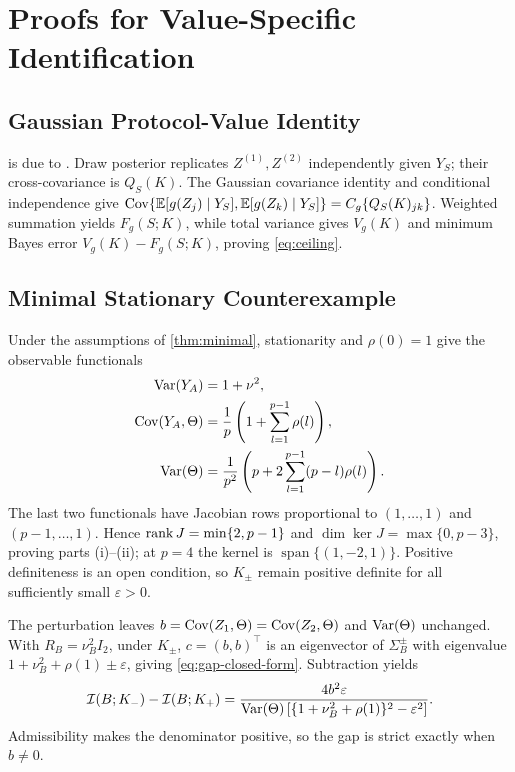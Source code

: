 \section{Proofs for Value-Specific Identification}
\label{sec:app-identification}

\subsection{Gaussian Protocol-Value Identity}

 is due to \citet{zhang2026label}. Draw posterior
replicates $Z^{(1)},Z^{(2)}$ independently given $Y_S$; their
cross-covariance is $Q_S(K)$. The Gaussian covariance identity and conditional
independence give
$\operatorname{Cov}\{\mathbb{E}[g(Z_j)\mid Y_S],\mathbb{E}[g(Z_k)\mid Y_S]\}=C_g\{Q_S(K)_{jk}\}$.
Weighted summation yields $F_g(S;K)$, while total variance gives $V_g(K)$ and
minimum Bayes error $V_g(K)-F_g(S;K)$, proving \eqref{eq:ceiling}.

\subsection{Minimal Stationary Counterexample}

Under the assumptions of \cref{thm:minimal}, stationarity and $\rho(0)=1$ give
the observable functionals
\begin{equation}
\begin{aligned}
\operatorname{Var}(Y_A)&=1+\nu^2,\\
\operatorname{Cov}(Y_A,\Theta)&=\frac1p\left(1+\sum_{l=1}^{p-1}\rho(l)\right),\\
\operatorname{Var}(\Theta)&=\frac1{p^2}\left(p+2\sum_{l=1}^{p-1}(p-l)\rho(l)\right).
\end{aligned}
\label{eq:stationary-observables}
\end{equation}
The last two functionals have Jacobian rows proportional to
$(1,\ldots,1)$ and $(p-1,\ldots,1)$. Hence
$\operatorname{rank} J=\min\{2,p-1\}$ and
$\dim\ker J=\max\{0,p-3\}$, proving parts (i)--(ii); at $p=4$ the kernel is
$\operatorname{span}\{(1,-2,1)\}$. Positive definiteness is an open condition,
so $K_\pm$ remain positive definite for all sufficiently small
$\varepsilon>0$.

The perturbation leaves
$b=\operatorname{Cov}(Z_1,\Theta)=\operatorname{Cov}(Z_2,\Theta)$ and $\operatorname{Var}(\Theta)$ unchanged. With
$R_B=\nu_B^2 I_2$, under $K_\pm$, $c=(b,b)^\top$ is an eigenvector of
$\Sigma_B^\pm$ with eigenvalue
$1+\nu_B^2+\rho(1)\pm\varepsilon$, giving
\eqref{eq:gap-closed-form}. Subtraction yields
\begin{equation}
\mathcal{I}(B;K_-)-\mathcal{I}(B;K_+)
=\frac{4b^2\varepsilon}
{\operatorname{Var}(\Theta)\left[\{1+\nu_B^2+\rho(1)\}^2-\varepsilon^2\right]}.
\label{eq:gap-value}
\end{equation}
Admissibility makes the denominator positive, so the gap is strict exactly
when $b\ne0$.


